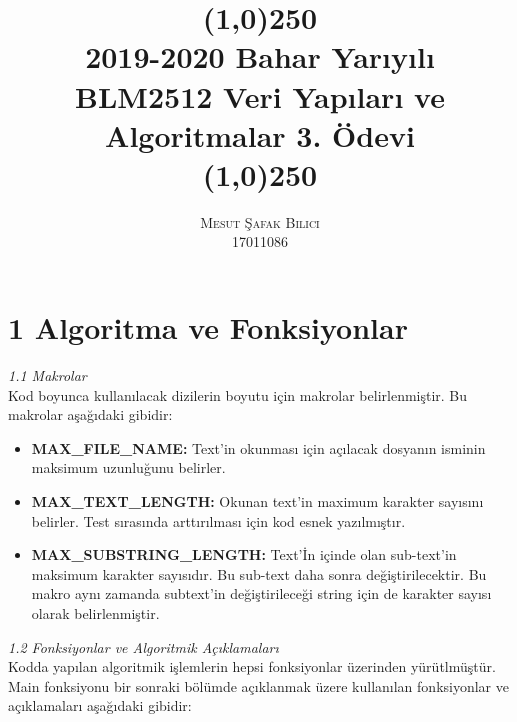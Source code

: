 \documentclass[11pt]{article}
\date{}
\begin{document}
\title{\line(1,0){250} \\ \huge{\textbf{2019-2020 Bahar Yarıyılı \\ BLM2512 Veri Yapıları ve Algoritmalar 3. Ödevi}} \\\line(1,0){250}}
\author{\textsc{Mesut Şafak Bilici} \\ 17011086}
\maketitle
\section{1 Algoritma ve Fonksiyonlar}
\textit{\large{1.1 Makrolar}}\\
\hspace*{1cm} Kod boyunca kullanılacak dizilerin boyutu için makrolar belirlenmiştir. Bu makrolar aşağıdaki gibidir:
\begin{itemize}
	\item \textbf{MAX\_FILE\_NAME:} Text'in okunması için açılacak dosyanın 			   isminin maksimum uzunluğunu belirler.
	\item \textbf{MAX\_TEXT\_LENGTH:} Okunan text'in maximum karakter sayısını
		   belirler. Test sırasında arttırılması için kod esnek yazılmıştır.
	\item \textbf{MAX\_SUBSTRING\_LENGTH:} Text'İn içinde olan sub-text'in
		   maksimum karakter sayısıdır. Bu sub-text daha sonra 				 			   değiştirilecektir. Bu makro aynı zamanda subtext'in değiştirileceği
		   string için de karakter sayısı olarak belirlenmiştir.
\end{itemize}
\textit{\large{1.2 Fonksiyonlar ve Algoritmik Açıklamaları}}\\
\hspace*{1cm} Kodda yapılan algoritmik işlemlerin hepsi fonksiyonlar üzerinden yürütlmüştür. Main fonksiyonu bir sonraki bölümde açıklanmak üzere kullanılan fonksiyonlar ve açıklamaları aşağıdaki gibidir:
\end{document}
